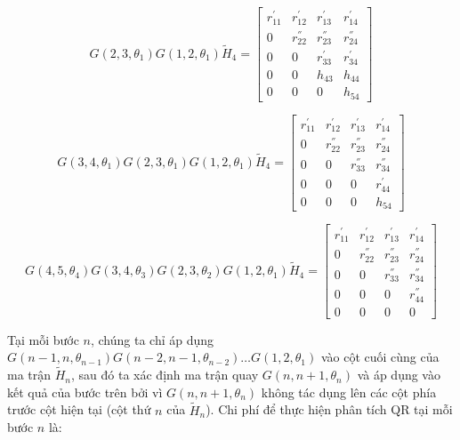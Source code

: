 \documentclass[14pt, a4paper]{article}
\numberwithin{equation}{section}
\numberwithin{algorithm}{section}
\numberwithin{figure}{section}
\numberwithin{dl}{section}
\numberwithin{md}{section}
\numberwithin{bd}{section}
\begin{document}
\begin{equation}
    G(2, 3, \theta_1)G(1, 2, \theta_1) \widetilde{H}_4 = \begin{bmatrix} r_{11}^{'} & r_{12}^{'} & r_{13}^{'} & r_{14}^{'} \\
        0 & r_{22}^{''} & r_{23}^{''} & r_{24}^{''} \\
        0 & 0 & r_{33}^{'} & r_{34}^{'} \\
        0 & 0 & h_{43} & h_{44} \\
        0 & 0 & 0 & h_{54}  \end{bmatrix}
\end{equation}

\begin{equation}
    G(3, 4, \theta_1)G(2, 3, \theta_1)G(1, 2, \theta_1) \widetilde{H}_4 = \begin{bmatrix} r_{11}^{'} & r_{12}^{'} & r_{13}^{'} & r_{14}^{'} \\
        0 & r_{22}^{''} & r_{23}^{''} & r_{24}^{''} \\
        0 & 0 & r_{33}^{''} & r_{34}^{''} \\
        0 & 0 & 0 & r_{44}^{'} \\
        0 & 0 & 0 & h_{54}  \end{bmatrix}
\end{equation}

\begin{equation}
    G(4, 5, \theta_4)G(3, 4, \theta_3)G(2, 3, \theta_2)G(1, 2, \theta_1) \widetilde{H}_4 = \begin{bmatrix} r_{11}^{'} & r_{12}^{'} & r_{13}^{'} & r_{14}^{'} \\
        0 & r_{22}^{''} & r_{23}^{''} & r_{24}^{''} \\
        0 & 0 & r_{33}^{''} & r_{34}^{''} \\
        0 & 0 & 0 & r_{44}^{''} \\
        0 & 0 & 0 & 0  \end{bmatrix}
\end{equation}

Tại mỗi bước $n$, chúng ta chỉ áp dụng $G(n-1, n, \theta_{n-1})G(n-2, n-1, \theta_{n-2})\dots G(1, 2, \theta_1)$ vào cột cuối cùng của ma trận $\widetilde{H}_n$, sau đó ta xác định ma trận quay $G(n, n+1, \theta_{n})$ và áp dụng vào kết quả của bước trên bởi vì $G(n, n+1, \theta_{n})$ không tác dụng lên các cột phía trước cột hiện tại (cột thứ $n$ của $\widetilde{H}_n$). Chi phí để thực hiện phân tích QR tại mỗi bước $n$ là:
\end{document}
